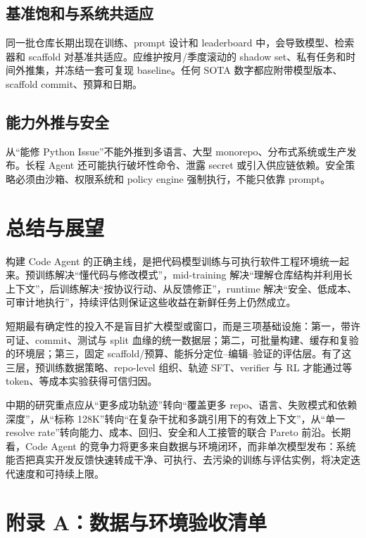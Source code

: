\documentclass[10pt,a4paper,UTF8,fontset=none]{ctexart}
\begin{document}
\subsection{基准饱和与系统共适应}

同一批仓库长期出现在训练、prompt 设计和 leaderboard 中，会导致模型、检索器和 scaffold 对基准共适应。应维护按月/季度滚动的 shadow set、私有任务和时间外推集，并冻结一套可复现 baseline。任何 SOTA 数字都应附带模型版本、scaffold commit、预算和日期。

\subsection{能力外推与安全}

从“能修 Python Issue”不能外推到多语言、大型 monorepo、分布式系统或生产发布。长程 Agent 还可能执行破坏性命令、泄露 secret 或引入供应链依赖。安全策略必须由沙箱、权限系统和 policy engine 强制执行，不能只依靠 prompt。

\section{总结与展望}

构建 Code Agent 的正确主线，是把代码模型训练与可执行软件工程环境统一起来。预训练解决“懂代码与修改模式”，mid-training 解决“理解仓库结构并利用长上下文”，后训练解决“按协议行动、从反馈修正”，runtime 解决“安全、低成本、可审计地执行”，持续评估则保证这些收益在新鲜任务上仍然成立。

短期最有确定性的投入不是盲目扩大模型或窗口，而是三项基础设施：第一，带许可证、commit、测试与 split 血缘的统一数据层；第二，可批量构建、缓存和复验的环境层；第三，固定 scaffold/预算、能拆分定位--编辑--验证的评估层。有了这三层，预训练数据策略、repo-level 组织、轨迹 SFT、verifier 与 RL 才能通过等 token、等成本实验获得可信归因。

中期的研究重点应从“更多成功轨迹”转向“覆盖更多 repo、语言、失败模式和依赖深度”，从“标称 128K”转向“在复杂干扰和多跳引用下的有效上下文”，从“单一 resolve rate”转向能力、成本、回归、安全和人工接管的联合 Pareto 前沿。长期看，Code Agent 的竞争力将更多来自数据与环境闭环，而非单次模型发布：系统能否把真实开发反馈快速转成干净、可执行、去污染的训练与评估实例，将决定迭代速度和可持续上限。

\clearpage
\appendix
\section{附录 A：数据与环境验收清单}
\end{document}
